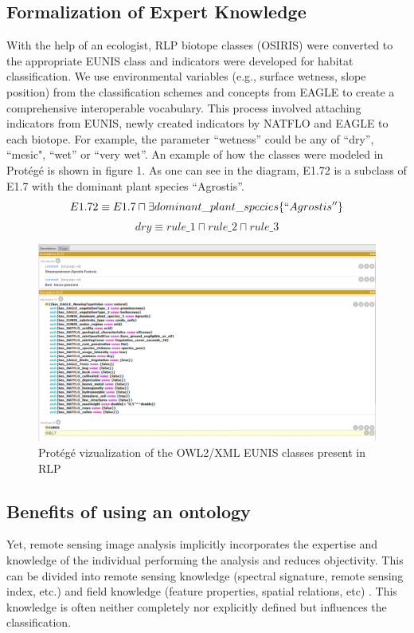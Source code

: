 \documentclass[authoryear, review,12pt,number]{elsarticle}
\begin{document}
\subsection{Formalization of Expert Knowledge}
With the help of an ecologist, RLP biotope classes (OSIRIS) were converted
to the appropriate EUNIS class and indicators were developed for habitat
classification. We use environmental variables (e.g., surface wetness, slope
position) from the classification schemes and concepts from EAGLE to create a
comprehensive interoperable vocabulary. This process involved attaching
indicators from EUNIS, newly created indicators by NATFLO and EAGLE to each
biotope. For example, the parameter ``wetness'' could be any of ``dry'',
``mesic", ``wet'' or ``very wet''. An example of how the classes were  modeled
in Prot\'eg\'e is shown in figure 1. As one can see in the diagram, E1.72 is a
subclass of E1.7 with the dominant plant species ``Agrostis''.
$$ E1.72 \equiv  E1.7 \sqcap \exists dominant\_plant\_species
\{``Agrostis'' \}$$
$$
dry \equiv rule\_1 \sqcap rule\_2 \sqcap rule\_3
$$
\begin{figure}
	
\includegraphics[width=1\linewidth]{diagrams/protege_description_eunis.PNG}
	\caption{Prot\'eg\'e vizualization of the OWL2/XML EUNIS classes present in
	RLP}
\end{figure}

\subsection{Benefits of using an ontology}
Yet, remote sensing
image analysis implicitly incorporates the expertise and knowledge of the
individual performing the analysis and reduces objectivity. This can be divided
into remote sensing knowledge (spectral signature, remote sensing index, etc.)
and field knowledge (feature properties, spatial relations, etc)
\citep{Andres2013a}. This knowledge is often neither completely nor explicitly
defined but influences the classification.
\end{document}

